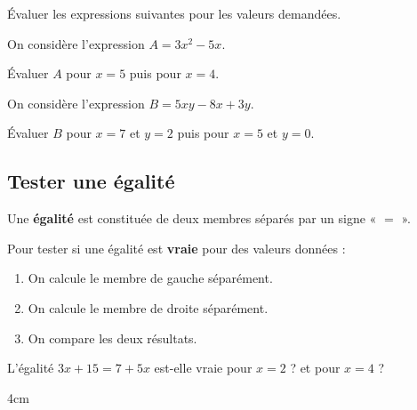 \documentclass[a4paper]{book}
\begin{document}
    
    \begin{exemple}
        Évaluer les expressions suivantes pour les valeurs demandées.

        \smallskip

        \begin{minipage}{0.49\linewidth}
            On considère l'expression $A=3x^2-5x$.

            \smallskip

            Évaluer $A$ pour $x=5$ puis pour $x=4$.

            \vspace{4.5cm}
        \end{minipage}
        \hfill\vline\hfill
        \begin{minipage}{0.49\linewidth}
            On considère l'expression $B=5xy-8x+3y$.

            \smallskip

            Évaluer $B$ pour $x=7$ et $y=2$ puis pour $x=5$ et $y=0$.

            \vspace{4.5cm}
        \end{minipage}
    \end{exemple}
    
    
\subsection{Tester une égalité}
    
    \begin{definition}[Égalité]
        Une \textbf{égalité} est constituée de deux membres séparés par un signe « $=$ ».
    \end{definition}
    
    
    \begin{methode}
        Pour tester si une égalité est \textbf{vraie} pour des valeurs données :
        \begin{enumerate}
            \item On calcule le membre de gauche séparément.
            \item On calcule le membre de droite séparément.
            \item On compare les deux résultats.
        \end{enumerate}
    \end{methode}
    
    
    \begin{exemple}
        L'égalité $3x + 15 = 7 + 5x$ est-elle vraie pour $x = 2$ ? et pour $x = 4$ ?
        \begin{ZoneReponse}{4cm}
            
        \end{ZoneReponse}
    \end{exemple}
\end{document}

